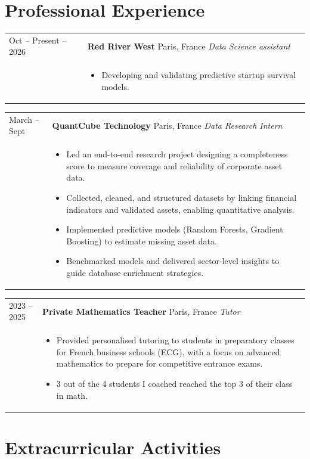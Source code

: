 \documentclass[11pt,a4paper]{article}
\makeatletter
\newlength{\datecolwidth}
\newcommand{\CVItem}[5]{%
    \noindent%
    \begin{tabularx}{\textwidth}{@{}p{\datecolwidth} X@{}}
        #1 & \textbf{#2} \hfill #3 \newline \textit{#4} \\ %
           & #5 
    \end{tabularx}%
    \vspace{2pt}%
}
\makeatother
\begin{document}
\section{Professional Experience}

\CVItem{Oct -- Present \newline 2025 -- 2026}
    {Red River West}
    {Paris, France}
    {Data Science assistant}
    {\begin{itemize}
        \item Developing and validating predictive startup survival models.
    \end{itemize}}

\CVItem{March -- Sept \newline 2025}
    {QuantCube Technology}
    {Paris, France}
    {Data Research Intern}
    {\begin{itemize}
        \item Led an end-to-end research project designing a completeness score to measure coverage and reliability of corporate asset data.
        \item Collected, cleaned, and structured datasets by linking financial indicators and validated assets, enabling quantitative analysis.
        \item Implemented predictive models (Random Forests, Gradient Boosting) to estimate missing asset data.
        \item Benchmarked models and delivered sector-level insights to guide database enrichment strategies.
    \end{itemize}}

\CVItem{2023 -- 2025}
    {Private Mathematics Teacher}
    {Paris, France}
    {Tutor}
    {\begin{itemize}
        \item Provided personalised tutoring to students in preparatory classes for French business schools (ECG), with a focus on advanced mathematics to prepare for competitive entrance exams.
        \item 3 out of the 4 students I coached reached the top 3 of their class in math.
    \end{itemize}}

\section{Extracurricular Activities}
\end{document}
